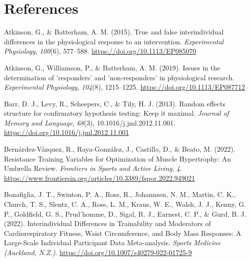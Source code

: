 \documentclass[
]{article}
\newlength{\cslhangindent}
\newlength{\cslentryspacingunit} %
\newenvironment{CSLReferences}[2] %
 {%
  \setlength{\parindent}{0pt}
  \ifodd #1
  \let\oldpar\par
  \def\par{\hangindent=\cslhangindent\oldpar}
  \fi
  \setlength{\parskip}{#2\cslentryspacingunit}
 }%
 {}
\begin{document}
\hypertarget{references}{%
\section{References}\label{references}}

\hypertarget{refs}{}
\begin{CSLReferences}{1}{0}
\leavevmode{}%
Atkinson, G., \& Batterham, A. M. (2015). True and false interindividual differences in the physiological response to an intervention. \emph{Experimental Physiology}, \emph{100}(6), 577--588. \url{https://doi.org/10.1113/EP085070}

\leavevmode{}%
Atkinson, G., Williamson, P., \& Batterham, A. M. (2019). Issues in the determination of 'responders' and 'non-responders' in physiological research. \emph{Experimental Physiology}, \emph{104}(8), 1215--1225. \url{https://doi.org/10.1113/EP087712}

\leavevmode{}%
Barr, D. J., Levy, R., Scheepers, C., \& Tily, H. J. (2013). Random effects structure for confirmatory hypothesis testing: {Keep} it maximal. \emph{Journal of Memory and Language}, \emph{68}(3), 10.1016/j.jml.2012.11.001. \url{https://doi.org/10.1016/j.jml.2012.11.001}

\leavevmode{}%
Bernárdez-Vázquez, R., Raya-González, J., Castillo, D., \& Beato, M. (2022). Resistance {Training} {Variables} for {Optimization} of {Muscle} {Hypertrophy}: {An} {Umbrella} {Review}. \emph{Frontiers in Sports and Active Living}, \emph{4}. \url{https://www.frontiersin.org/articles/10.3389/fspor.2022.949021}

\leavevmode{}%
Bonafiglia, J. T., Swinton, P. A., Ross, R., Johannsen, N. M., Martin, C. K., Church, T. S., Slentz, C. A., Ross, L. M., Kraus, W. E., Walsh, J. J., Kenny, G. P., Goldfield, G. S., Prud'homme, D., Sigal, R. J., Earnest, C. P., \& Gurd, B. J. (2022). Interindividual {Differences} in {Trainability} and {Moderators} of {Cardiorespiratory} {Fitness}, {Waist} {Circumference}, and {Body} {Mass} {Responses}: {A} {Large}-{Scale} {Individual} {Participant} {Data} {Meta}-analysis. \emph{Sports Medicine (Auckland, N.Z.)}. \url{https://doi.org/10.1007/s40279-022-01725-9}


\end{CSLReferences}
\end{document}
